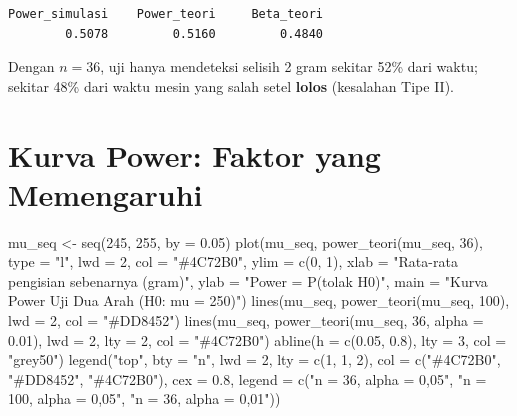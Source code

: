 \documentclass[
  indonesian,
  letterpaper,
]{book}
\newenvironment{Shaded}{\begin{snugshade}}{\end{snugshade}}
\newcommand{\AttributeTok}[1]{\textcolor[rgb]{0.40,0.45,0.13}{#1}}
\newcommand{\DecValTok}[1]{\textcolor[rgb]{0.68,0.00,0.00}{#1}}
\newcommand{\FloatTok}[1]{\textcolor[rgb]{0.68,0.00,0.00}{#1}}
\newcommand{\FunctionTok}[1]{\textcolor[rgb]{0.28,0.35,0.67}{#1}}
\newcommand{\NormalTok}[1]{\textcolor[rgb]{0.00,0.23,0.31}{#1}}
\newcommand{\OtherTok}[1]{\textcolor[rgb]{0.00,0.23,0.31}{#1}}
\newcommand{\StringTok}[1]{\textcolor[rgb]{0.13,0.47,0.30}{#1}}
\begin{document}
\begin{verbatim}
Power_simulasi    Power_teori     Beta_teori 
        0.5078         0.5160         0.4840 
\end{verbatim}

Dengan \(n = 36\), uji hanya mendeteksi selisih 2 gram sekitar 52\% dari
waktu; sekitar 48\% dari waktu mesin yang salah setel \textbf{lolos}
(kesalahan Tipe II).

\section{Kurva Power: Faktor yang
Memengaruhi}\label{kurva-power-faktor-yang-memengaruhi}

\begin{Shaded}
\begin{Highlighting}[]
\NormalTok{mu\_seq }\OtherTok{\textless{}{-}} \FunctionTok{seq}\NormalTok{(}\DecValTok{245}\NormalTok{, }\DecValTok{255}\NormalTok{, }\AttributeTok{by =} \FloatTok{0.05}\NormalTok{)}
\FunctionTok{plot}\NormalTok{(mu\_seq, }\FunctionTok{power\_teori}\NormalTok{(mu\_seq, }\DecValTok{36}\NormalTok{), }\AttributeTok{type =} \StringTok{"l"}\NormalTok{, }\AttributeTok{lwd =} \DecValTok{2}\NormalTok{, }\AttributeTok{col =} \StringTok{"\#4C72B0"}\NormalTok{,}
     \AttributeTok{ylim =} \FunctionTok{c}\NormalTok{(}\DecValTok{0}\NormalTok{, }\DecValTok{1}\NormalTok{),}
     \AttributeTok{xlab =} \StringTok{"Rata{-}rata pengisian sebenarnya (gram)"}\NormalTok{, }\AttributeTok{ylab =} \StringTok{"Power = P(tolak H0)"}\NormalTok{,}
     \AttributeTok{main =} \StringTok{"Kurva Power Uji Dua Arah (H0: mu = 250)"}\NormalTok{)}
\FunctionTok{lines}\NormalTok{(mu\_seq, }\FunctionTok{power\_teori}\NormalTok{(mu\_seq, }\DecValTok{100}\NormalTok{), }\AttributeTok{lwd =} \DecValTok{2}\NormalTok{, }\AttributeTok{col =} \StringTok{"\#DD8452"}\NormalTok{)}
\FunctionTok{lines}\NormalTok{(mu\_seq, }\FunctionTok{power\_teori}\NormalTok{(mu\_seq, }\DecValTok{36}\NormalTok{, }\AttributeTok{alpha =} \FloatTok{0.01}\NormalTok{), }\AttributeTok{lwd =} \DecValTok{2}\NormalTok{, }\AttributeTok{lty =} \DecValTok{2}\NormalTok{,}
      \AttributeTok{col =} \StringTok{"\#4C72B0"}\NormalTok{)}
\FunctionTok{abline}\NormalTok{(}\AttributeTok{h =} \FunctionTok{c}\NormalTok{(}\FloatTok{0.05}\NormalTok{, }\FloatTok{0.8}\NormalTok{), }\AttributeTok{lty =} \DecValTok{3}\NormalTok{, }\AttributeTok{col =} \StringTok{"grey50"}\NormalTok{)}
\FunctionTok{legend}\NormalTok{(}\StringTok{"top"}\NormalTok{, }\AttributeTok{bty =} \StringTok{"n"}\NormalTok{, }\AttributeTok{lwd =} \DecValTok{2}\NormalTok{, }\AttributeTok{lty =} \FunctionTok{c}\NormalTok{(}\DecValTok{1}\NormalTok{, }\DecValTok{1}\NormalTok{, }\DecValTok{2}\NormalTok{),}
       \AttributeTok{col =} \FunctionTok{c}\NormalTok{(}\StringTok{"\#4C72B0"}\NormalTok{, }\StringTok{"\#DD8452"}\NormalTok{, }\StringTok{"\#4C72B0"}\NormalTok{), }\AttributeTok{cex =} \FloatTok{0.8}\NormalTok{,}
       \AttributeTok{legend =} \FunctionTok{c}\NormalTok{(}\StringTok{"n = 36, alpha = 0,05"}\NormalTok{, }\StringTok{"n = 100, alpha = 0,05"}\NormalTok{,}
                  \StringTok{"n = 36, alpha = 0,01"}\NormalTok{))}
\end{Highlighting}
\end{Shaded}
\end{document}
